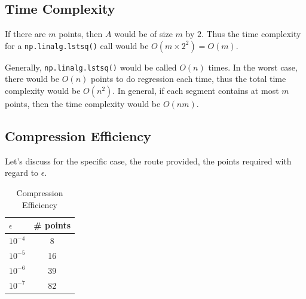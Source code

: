 \documentclass[12pt, a4paper]{article}
\begin{document}
\subsection{Time Complexity}

If there are $m$ points, then $A$ would be of size $m$ by $2$. Thus the time complexity for a \texttt{np.linalg.lstsq()} call would be $O(m\times2^2)=O(m)$.

Generally, \texttt{np.linalg.lstsq()} would be called $O(n)$ times. In the worst case, there would be $O(n)$ points to do regression each time, thus the total time complexity would be $O(n^2)$. In general, if each segment contains at most $m$ points, then the time complexity would be $O(nm)$.

\subsection{Compression Efficiency}

Let's discuss for the specific case, the route provided, the points required with regard to $\epsilon$.

\begin{table}[htp]
\centering
\caption{Compression Efficiency}
\begin{tabular}{lc}
\toprule
$\epsilon$ & \# points \\
\midrule
$10^{-4}$ & 8 \\
$10^{-5}$ & 16 \\
$10^{-6}$ & 39 \\
$10^{-7}$ & 82 \\
\bottomrule
\end{tabular}
\label{tab:q3}
\end{table}
\end{document}
